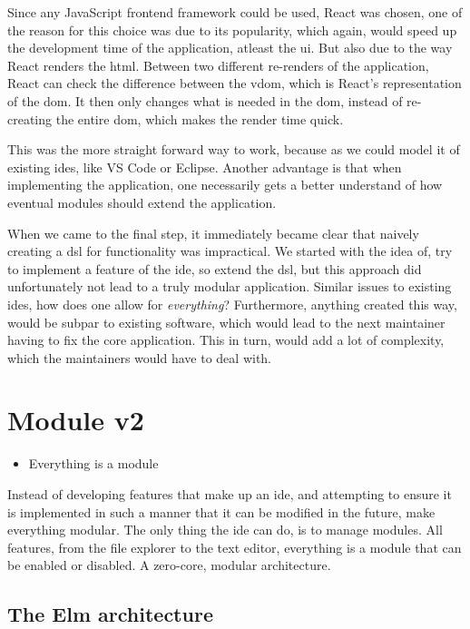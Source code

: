 Since any JavaScript frontend framework could be used, React was chosen, one of
the reason for this choice was due to its popularity, which again, would speed
up the development time of the application, atleast the \gls*{ui}. But also due
to the way React renders the \gls*{html}. Between two different re-renders of
the application, React can check the difference between the \gls*{vdom}, which
is React's representation of the \gls*{dom}. It then only changes what is needed
in the \gls*{dom}, instead of re-creating the entire \gls*{dom}, which makes the
render time quick.

This was the more straight forward way to work, because as we could model it of
existing \gls*{ide}s, like VS Code or Eclipse. Another advantage is that when
implementing the application, one necessarily gets a better understand of how
eventual modules should extend the application.

When we came to the final step, it immediately became clear that naively
creating a \gls*{dsl} for functionality was impractical. We started with the
idea of, try to implement a feature of the \gls*{ide}, so extend the \gls*{dsl},
but this approach did unfortunately not lead to a truly modular application.
Similar issues to existing \gls*{ide}s, how does one allow for
\textit{everything}? Furthermore, anything created this way, would be subpar to
existing software, which would lead to the next maintainer having to fix the
core application. This in turn, would add a lot of complexity, which the
maintainers would have to deal with.


\section{Module v2} \label{sec:mod2}

\begin{itemize}
  \item Everything is a module
\end{itemize}

Instead of developing features that make up an \gls*{ide}, and attempting to
ensure it is implemented in such a manner that it can be modified in the future,
make everything modular. The only thing the \gls*{ide} can do, is to manage
modules. All features, from the file explorer to the text editor, everything is
a module that can be enabled or disabled. A zero-core, modular architecture.

\subsection{The Elm architecture}

